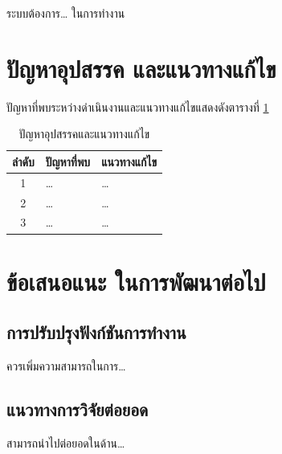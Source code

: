 ระบบต้องการ\ldots{} ในการทำงาน

\section{ปัญหาอุปสรรค และแนวทางแก้ไข}

ปัญหาที่พบระหว่างดำเนินงานและแนวทางแก้ไขแสดงดังตารางที่ \ref{tab:problems}

\begin{table}[H]
\centering
\caption{ปัญหาอุปสรรคและแนวทางแก้ไข}
\label{tab:problems}
\begin{tabular}{|c|l|l|}
\hline
\textbf{ลำดับ} & \textbf{ปัญหาที่พบ} & \textbf{แนวทางแก้ไข} \\
\hline
1 & \ldots & \ldots \\ \hline
2 & \ldots & \ldots \\ \hline
3 & \ldots & \ldots \\
\hline
\end{tabular}
\end{table}

\section{ข้อเสนอแนะ ในการพัฒนาต่อไป}

\subsection{การปรับปรุงฟังก์ชันการทำงาน}

ควรเพิ่มความสามารถในการ\ldots{}

\subsection{แนวทางการวิจัยต่อยอด}

สามารถนำไปต่อยอดในด้าน\ldots{}
